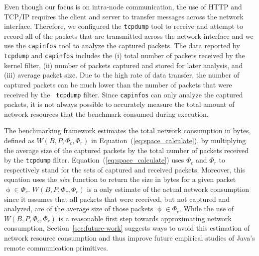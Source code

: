 \documentclass{sig-alternate}
\begin{document}


Even though our focus is on intra-node communication, the use of HTTP
and TCP/IP requires the client and server to transfer messages across
the network interface.  Therefore, we configured the \texttt{tcpdump}
tool to receive and attempt to record all of the packets that are
transmitted across the network interface and we use the {\tt capinfos}
tool to analyze the captured packets.  The data reported by {\tt
  tcpdump} and {\tt capinfos} includes the (i) total number of packets
received by the kernel filter, (ii) number of packets captured and
stored for later analysis, and (iii) average packet size.  Due to the
high rate of data transfer, the number of captured packets can be much
lower than the number of packets that were received by the {\tt
  tcpdump} filter.  Since \texttt{capinfos} can only analyze the
captured packets, it is not always possible to accurately measure the
total amount of network resources that the benchmark consumed during
execution.  

\begin{sloppypar}
The benchmarking framework estimates the total network consumption in
bytes, defined as $W(B,P, \Phi_c, \Phi_r)$ in
Equation~(\ref{eq:space_calculate}), by multiplying the average size
of the captured packets by the total number of packets received by the
{\tt tcpdump} filter.  Equation~(\ref{eq:space_calculate}) uses
$\Phi_c$ and $\Phi_r$ to respectively stand for the sets of captured
and received packets.  Moreover, this equation uses the {\em size}
function to return the size in bytes for a given packet $\upphi \in
\Phi_c$.  $W(B,P, \Phi_c, \Phi_r)$ is a only estimate of the actual
network consumption since it assumes that all packets that were
received, but not captured and analyzed, are of the average size of
those packets $\upphi \in \Phi_c$.  While the use of $W(B,P, \Phi_c,
\Phi_r)$ is a reasonable first step towards approximating network
consumption, Section~\ref{sec:future-work} suggests ways to avoid this
estimation of network resource consumption and thus improve future
empirical studies of Java's remote communication primitives.
\end{sloppypar}

\vspace*{-.1in}
\end{document}
